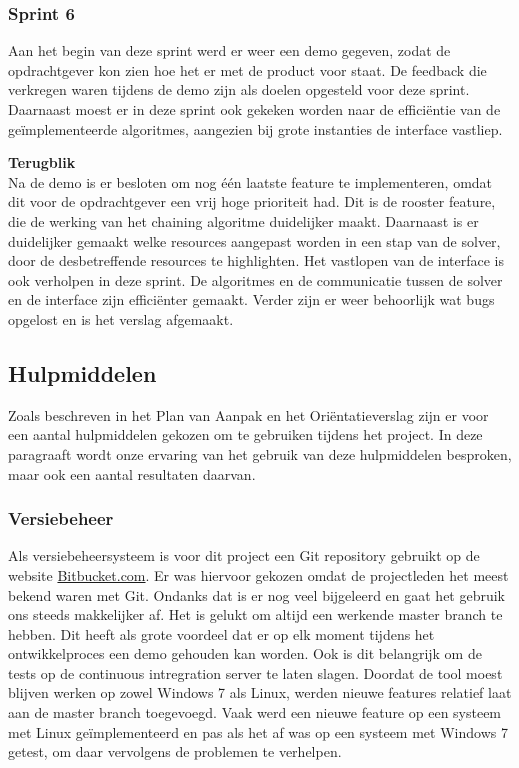 \subsubsection{Sprint 6}
Aan het begin van deze sprint werd er weer een demo gegeven, zodat de opdrachtgever kon zien hoe het er met de product voor staat. De feedback die verkregen waren tijdens de demo zijn als doelen opgesteld voor deze sprint. Daarnaast moest er in deze sprint ook gekeken worden naar de effici\"entie van de ge\"implementeerde algoritmes, aangezien bij grote instanties de interface vastliep.

\textbf{Terugblik} \\
Na de demo is er besloten om nog \'e\'en laatste feature te implementeren, omdat dit voor de opdrachtgever een vrij hoge prioriteit had. Dit is de rooster feature, die de werking van het chaining algoritme duidelijker maakt. Daarnaast is er duidelijker gemaakt welke resources aangepast worden in een stap van de solver, door de desbetreffende resources te highlighten. Het vastlopen van de interface is ook verholpen in deze sprint. De algoritmes en de communicatie tussen de solver en de interface zijn effici\"enter gemaakt. Verder zijn er weer behoorlijk wat bugs opgelost en is het verslag afgemaakt. 

\subsection{Hulpmiddelen}
Zoals beschreven in het Plan van Aanpak en het Ori\"entatieverslag zijn er voor een aantal hulpmiddelen gekozen om te gebruiken tijdens het project. In deze paragraaft wordt onze ervaring van het gebruik van deze hulpmiddelen besproken, maar ook een aantal resultaten daarvan. 

\subsubsection{Versiebeheer}
\label{subsec:versiebeheer}
Als versiebeheersysteem is voor dit project een Git repository gebruikt op de website \href{http://bitbucket.com}{Bitbucket.com}. Er was hiervoor gekozen omdat de projectleden het meest bekend waren met Git. Ondanks dat is er nog veel bijgeleerd en gaat het gebruik ons steeds makkelijker af. Het is gelukt om altijd een werkende master branch te hebben. Dit heeft als grote voordeel dat er op elk moment tijdens het ontwikkelproces een demo gehouden kan worden. Ook is dit belangrijk om de tests op de continuous intregration server te laten slagen. Doordat de tool moest blijven werken op zowel Windows 7 als Linux, werden nieuwe features relatief laat aan de master branch toegevoegd. Vaak werd een nieuwe feature op een systeem met Linux ge\"implementeerd en pas als het af was op een systeem met Windows 7 getest, om daar vervolgens de problemen te verhelpen.

